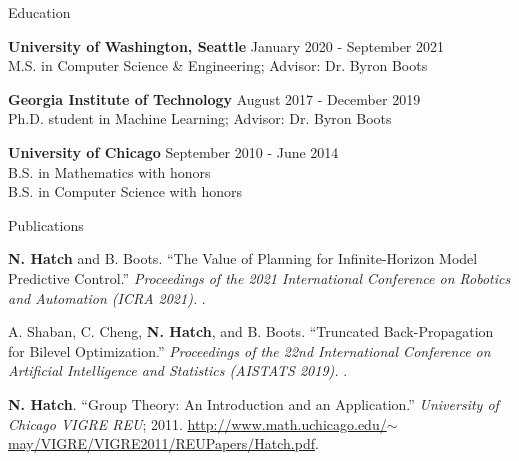 \documentclass{resume} %
\begin{document}
\begin{rSection}{Education}

{\bf University of Washington, Seattle} \hfill {January 2020 - September 2021} \\
M.S. in Computer Science \& Engineering; Advisor: Dr. Byron Boots

{\bf Georgia Institute of Technology} \hfill {August 2017 - December 2019} \\
Ph.D. student in Machine Learning; Advisor: Dr. Byron Boots

{\bf University of Chicago} \hfill {September 2010 - June 2014} \\
B.S. in Mathematics with honors \\
B.S. in Computer Science with honors

\end{rSection}

\begin{rSection}{Publications}

{\bf N. Hatch} and B. Boots. ``The Value of Planning for Infinite-Horizon Model Predictive Control.''
{\em Proceedings of the 2021 International Conference on Robotics and Automation (ICRA 2021).}
.

A. Shaban, C. Cheng, {\bf N. Hatch}, and B. Boots. ``Truncated Back-Propagation for Bilevel Optimization.''
{\em Proceedings of the 22nd International Conference on Artificial Intelligence and Statistics (AISTATS 2019).}
.

{\bf N. Hatch}. ``Group Theory: An Introduction and an Application.'' {\em University of Chicago VIGRE REU}; 2011.
\href{http://www.math.uchicago.edu/~may/VIGRE/VIGRE2011/REUPapers/Hatch.pdf}{http://www.math.uchicago.edu/$\sim$may/VIGRE/VIGRE2011/REUPapers/Hatch.pdf}.

\end{rSection}
\end{document}
